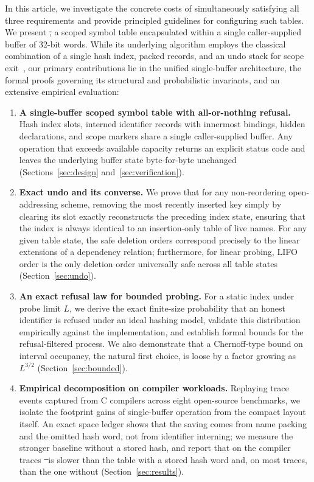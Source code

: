 In this article, we investigate the concrete costs of simultaneously satisfying all three requirements and provide principled guidelines for configuring such tables. We present \st, a scoped symbol table encapsulated within a single caller-supplied buffer of 32-bit words. While its underlying algorithm employs the classical combination of a single hash index, packed records, and an undo stack for scope exit~\cite{appel1998}, our primary contributions lie in the unified single-buffer architecture, the formal proofs governing its structural and probabilistic invariants, and an extensive empirical evaluation:

\begin{enumerate}
\item \textbf{A single-buffer scoped symbol table with all-or-nothing refusal.} Hash index slots, interned identifier records with innermost bindings, hidden declarations, and scope markers share a single caller-supplied buffer. Any operation that exceeds available capacity returns an explicit status code and leaves the underlying buffer state byte-for-byte unchanged (Sections~\ref{sec:design} and~\ref{sec:verification}).
\item \textbf{Exact undo and its converse.} We prove that for any non-reordering open-addressing scheme, removing the most recently inserted key simply by clearing its slot exactly reconstructs the preceding index state, ensuring that the index is always identical to an insertion-only table of live names. For any given table state, the safe deletion orders correspond precisely to the linear extensions of a dependency relation; furthermore, for linear probing, LIFO order is the only deletion order universally safe across all table states (Section~\ref{sec:undo}).
\item \textbf{An exact refusal law for bounded probing.} For a static index under probe limit $L$, we derive the exact finite-size probability that an honest identifier is refused under an ideal hashing model, validate this distribution empirically against the implementation, and establish formal bounds for the refusal-filtered process. We also demonstrate that a Chernoff-type bound on interval occupancy, the natural first choice, is loose by a factor growing as $L^{3/2}$ (Section~\ref{sec:bounded}).
\item \textbf{Empirical decomposition on compiler workloads.} Replaying trace events captured from C compilers across eight open-source benchmarks, we isolate the footprint gains of single-buffer operation from the compact layout itself. An exact space ledger shows that the saving comes from name packing and the omitted hash word, not from identifier interning; we measure the stronger baseline without a stored hash, and report that on the compiler traces \st\ is slower than the table with a stored hash word and, on most traces, than the one without (Section~\ref{sec:results}).

\end{enumerate}

